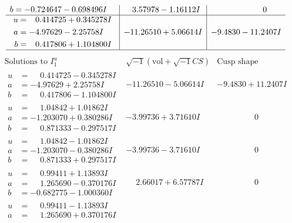 \documentclass[1p]{elsarticle_modified}
\theoremstyle{definition}
\newcommand{\I}{\sqrt{-1}}
\begin{document}
$$\begin{array}{c|c|c}
\begin{aligned}
b &= -0.724647 - 0.698496 I\end{aligned}
 & \phantom{-}3.57978 - 1.16112 I & \phantom{-0.000000 } 0 \\ \hline\begin{aligned}
u &= \phantom{-}0.414725 + 0.345278 I \\
a &= -4.97629 - 2.25758 I \\
b &= \phantom{-}0.417806 + 1.104800 I\end{aligned}
 & -11.26510 + 5.06614 I & -9.4830 - 11.2407 I\\
 \hline 
 \end{array}$$\newpage$$\begin{array}{c|c|c}  
\text{Solutions to }I^u_{1}& \I (\text{vol} + \sqrt{-1}CS) & \text{Cusp shape}\\
 \hline 
\begin{aligned}
u &= \phantom{-}0.414725 - 0.345278 I \\
a &= -4.97629 + 2.25758 I \\
b &= \phantom{-}0.417806 - 1.104800 I\end{aligned}
 & -11.26510 - 5.06614 I & -9.4830 + 11.2407 I \\ \hline\begin{aligned}
u &= \phantom{-}1.04842 + 1.01862 I \\
a &= -1.203070 + 0.380286 I \\
b &= \phantom{-}0.871333 - 0.297517 I\end{aligned}
 & -3.99736 + 3.71610 I & \phantom{-0.000000 } 0 \\ \hline\begin{aligned}
u &= \phantom{-}1.04842 - 1.01862 I \\
a &= -1.203070 - 0.380286 I \\
b &= \phantom{-}0.871333 + 0.297517 I\end{aligned}
 & -3.99736 - 3.71610 I & \phantom{-0.000000 } 0 \\ \hline\begin{aligned}
u &= \phantom{-}0.99411 + 1.13893 I \\
a &= \phantom{-}1.265690 - 0.370176 I \\
b &= -0.682775 - 1.000360 I\end{aligned}
 & \phantom{-}2.66017 + 6.57787 I & \phantom{-0.000000 } 0 \\ \hline\begin{aligned}
u &= \phantom{-}0.99411 - 1.13893 I \\
a &= \phantom{-}1.265690 + 0.370176 I \\

\end{aligned}
\end{array}$$
\end{document}
